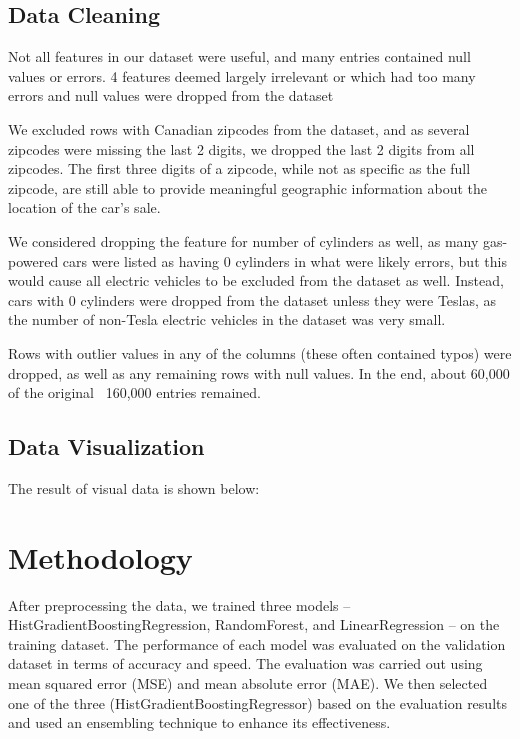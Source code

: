 \documentclass[UTF8]{ctexart}
\begin{document}
        \subsection{Data Cleaning}
        Not all features in our dataset were useful, and many entries contained null values or errors. 
        4 features deemed largely irrelevant or which had too many errors and null values were dropped from the dataset

        We excluded rows with Canadian zipcodes from the dataset, and as several zipcodes were missing the last
        2 digits, we dropped the last 2 digits from all zipcodes. The first three digits of a zipcode, while 
        not as specific as the full zipcode, are still able to provide meaningful geographic information about
        the location of the car's sale.
        
        We considered dropping the feature for number of cylinders as well, as many gas-powered cars were listed as 
        having 0 cylinders in what were likely errors, but this would cause all electric vehicles to be excluded 
        from the dataset as well. Instead, cars with 0 cylinders were dropped from the dataset unless they were
        Teslas, as the number of non-Tesla electric vehicles in the dataset was very small.

        Rows with outlier values in any of the columns (these often contained typos) were dropped, as well as
        any remaining rows with null values. In the end, about 60,000 of the original ~160,000 entries remained.
        \newline
        \subsection{Data Visualization}
        The result of visual data is shown below:
        \newline
    
    \section{Methodology}
    After preprocessing the data, we trained three models – HistGradientBoostingRegression, RandomForest, 
    and LinearRegression – on the training dataset. The performance of each model was evaluated on the validation dataset 
    in terms of accuracy and speed. The evaluation was carried out using mean squared error (MSE) and mean absolute error (MAE). 
    We then selected one of the three (HistGradientBoostingRegressor) based on the evaluation results and used an ensembling technique to enhance its effectiveness. 
    
\end{document}
